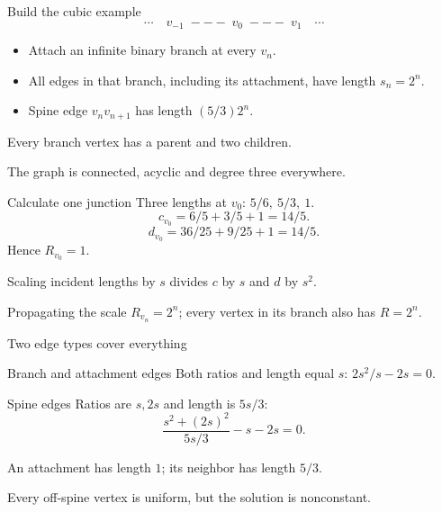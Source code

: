 \documentclass{beamer}
\begin{document}
\begin{frame}{Build the cubic example}
\[
\cdots\quad v_{-1}\;---\;v_0\;---\;v_1\quad\cdots
\]
\begin{itemize}
\item Attach an infinite binary branch at every $v_n$.
\item All edges in that branch, including its attachment, have length $s_n=2^n$.
\item Spine edge $v_nv_{n+1}$ has length $(5/3)2^n$.
\end{itemize}
Every branch vertex has a parent and two children.

The graph is connected, acyclic and degree three everywhere.
\end{frame}
\begin{frame}{Calculate one junction}
Three lengths at $v_0$: $5/6,\ 5/3,\ 1$.
\[
c_{v_0}=6/5+3/5+1=14/5.
\]
\[
d_{v_0}=36/25+9/25+1=14/5.
\]
Hence $R_{v_0}=1$.

Scaling incident lengths by $s$ divides $c$ by $s$ and $d$ by $s^2$.
\begin{block}{Propagating the scale}
$R_{v_n}=2^n$; every vertex in its branch also has $R=2^n$.
\end{block}
\end{frame}
\begin{frame}{Two edge types cover everything}
\begin{block}{Branch and attachment edges}
Both ratios and length equal $s$: $2s^2/s-2s=0$.
\end{block}
\begin{block}{Spine edges}
Ratios are $s,2s$ and length is $5s/3$:
\[
\frac{s^2+(2s)^2}{5s/3}-s-2s=0.
\]
\end{block}
An attachment has length $1$; its neighbor has length $5/3$.

Every off-spine vertex is uniform, but the solution is nonconstant.
\end{frame}
\end{document}

